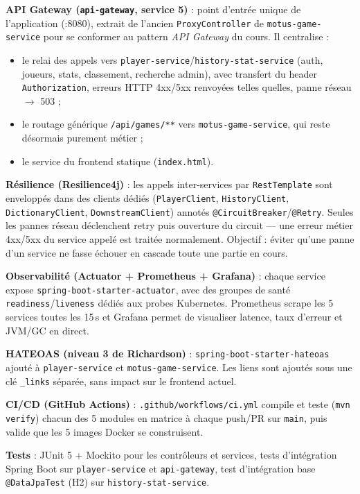 \documentclass[a4paper,11pt]{article}
\begin{document}
\textbf{API Gateway (\texttt{api-gateway}, service 5)} : point d'entr\'ee unique de l'application (:8080), extrait de l'ancien \texttt{ProxyController} de \texttt{motus-game-service} pour se conformer au pattern \emph{API Gateway} du cours. Il centralise :
\begin{itemize}[nosep]
  \item le relai des appels vers \texttt{player-service}/\texttt{history-stat-service} (auth, joueurs, stats, classement, recherche admin), avec transfert du header \texttt{Authorization}, erreurs HTTP 4xx/5xx renvoy\'ees telles quelles, panne r\'eseau $\rightarrow$ 503 ;
  \item le routage g\'en\'erique \texttt{/api/games/**} vers \texttt{motus-game-service}, qui reste d\'esormais purement m\'etier ;
  \item le service du frontend statique (\texttt{index.html}).
\end{itemize}

\textbf{R\'esilience (Resilience4j)} : les appels inter-services par \texttt{RestTemplate} sont envelopp\'es dans des clients d\'edi\'es (\texttt{PlayerClient}, \texttt{HistoryClient}, \texttt{DictionaryClient}, \texttt{DownstreamClient}) annot\'es \texttt{@CircuitBreaker}/\texttt{@Retry}. Seules les pannes r\'eseau d\'eclenchent retry puis ouverture du circuit --- une erreur m\'etier 4xx/5xx du service appel\'e est trait\'ee normalement. Objectif : \'eviter qu'une panne d'un service ne fasse \'echouer en cascade toute une partie en cours.

\textbf{Observabilit\'e (Actuator + Prometheus + Grafana)} : chaque service expose \texttt{spring-boot-starter-actuator}, avec des groupes de sant\'e \texttt{readiness}/\texttt{liveness} d\'edi\'es aux probes Kubernetes. Prometheus scrape les 5 services toutes les 15\,s et Grafana permet de visualiser latence, taux d'erreur et JVM/GC en direct.

\textbf{HATEOAS (niveau 3 de Richardson)} : \texttt{spring-boot-starter-hateoas} ajout\'e \`a \texttt{player-service} et \texttt{motus-game-service}. Les liens sont ajout\'es sous une cl\'e \texttt{\_links} s\'epar\'ee, sans impact sur le frontend actuel.

\textbf{CI/CD (GitHub Actions)} : \texttt{.github/workflows/ci.yml} compile et teste (\texttt{mvn verify}) chacun des 5 modules en matrice \`a chaque push/PR sur \texttt{main}, puis valide que les 5 images Docker se construisent.

\textbf{Tests} : JUnit 5 + Mockito pour les contr\^oleurs et services, tests d'int\'egration Spring Boot sur \texttt{player-service} et \texttt{api-gateway}, test d'int\'egration base \texttt{@DataJpaTest} (H2) sur \texttt{history-stat-service}.
\end{document}

